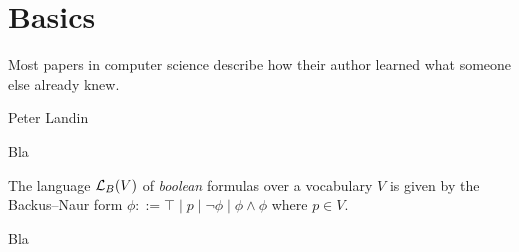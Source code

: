 
\chapter{Basics}\label{chapter:basics}

\setlength{\epigraphwidth}{9cm}
\epigraph{Most papers in computer science describe how their
author learned what someone else already knew.}{Peter Landin}

Bla %

\begin{definition}\label{def:bool-syntax}
The language $\mathcal{L}_B(V)$ of \emph{boolean} formulas over a vocabulary $V$ is
given by the Backus--Naur form
  $\phi ::= \top \mid p \mid \lnot \phi \mid \phi \land \phi$
where $p \in V$.
\end{definition}

Bla %
